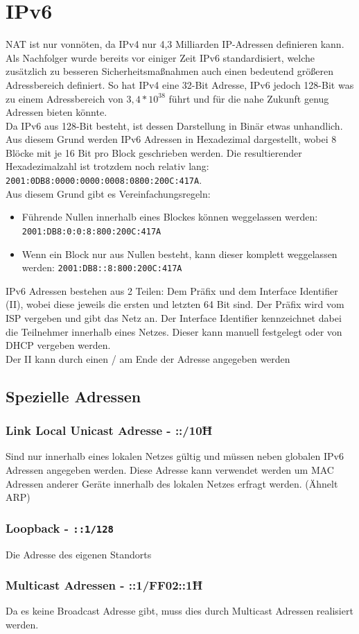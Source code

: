 \documentclass{article}
\begin{document}
	 \section{IPv6}
	 NAT ist nur vonnöten, da IPv4 nur 4,3 Milliarden IP-Adressen definieren kann. Als Nachfolger wurde bereits vor einiger Zeit IPv6 standardisiert, welche zusätzlich zu besseren Sicherheitsmaßnahmen auch einen bedeutend größeren Adressbereich definiert. So hat IPv4 eine 32-Bit Adresse, IPv6 jedoch 128-Bit was zu einem Adressbereich von $3,4*10^38$ führt und für die nahe Zukunft genug Adressen bieten könnte. \\
	 Da IPv6 aus 128-Bit besteht, ist dessen Darstellung in Binär etwas unhandlich. Aus diesem Grund werden IPv6 Adressen in Hexadezimal dargestellt, wobei 8 Blöcke mit je 16 Bit pro Block geschrieben werden. Die resultierender Hexadezimalzahl ist trotzdem noch relativ lang: \verb|2001:0DB8:0000:0000:0008:0800:200C:417A|.\\
	 Aus diesem Grund gibt es Vereinfachungsregeln:
	 \begin{itemize}
	  	\item{Führende Nullen innerhalb eines Blockes können weggelassen werden: \verb|2001:DB8:0:0:8:800:200C:417A|}
	  	\item{Wenn ein Block nur aus Nullen besteht, kann dieser komplett weggelassen werden: \verb|2001:DB8::8:800:200C:417A|}
	  \end{itemize} 
	  IPv6 Adressen bestehen aus 2 Teilen: Dem Präfix und dem Interface Identifier (II), wobei diese jeweils die ersten und letzten 64 Bit sind. Der Präfix wird vom ISP vergeben und gibt das Netz an. Der Interface Identifier kennzeichnet dabei die Teilnehmer innerhalb eines Netzes. Dieser kann manuell festgelegt oder von DHCP vergeben werden. \\
	  Der II kann durch einen / am Ende der Adresse angegeben werden
	  \subsection{Spezielle Adressen}
	  \cprotect\subsubsection{Link Local Unicast Adresse - \texorpdfstring{::/10Ħ}{      } }
	  Sind nur innerhalb eines lokalen Netzes gültig und müssen neben globalen IPv6 Adressen angegeben werden. Diese Adresse kann verwendet werden um MAC Adressen anderer Geräte innerhalb des lokalen Netzes erfragt werden. (Ähnelt ARP)
	  \cprotect\subsubsection{Loopback - \verb|::1/128| }
	  Die Adresse des eigenen Standorts
	  \cprotect\subsubsection{Multicast Adressen - \texorpdfstring{::1/FF02::1Ħ}{} }
	  Da es keine Broadcast Adresse gibt, muss dies durch Multicast Adressen realisiert werden. 
\end{document}
